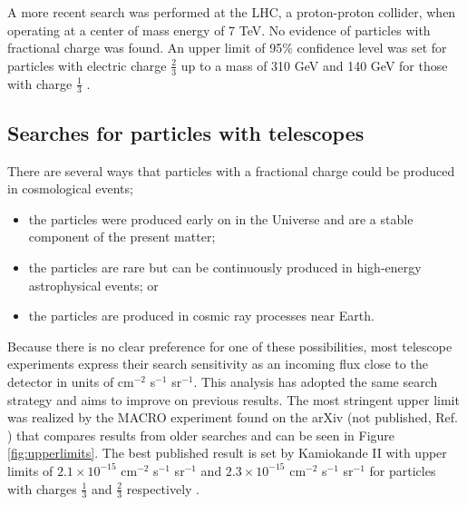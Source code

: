A more recent search was performed at the LHC, a proton-proton collider, when operating at a center of mass energy of 7 TeV. No evidence of particles with fractional charge was found. An upper limit of 95\% confidence level was set for particles with electric charge $\frac{2}{3}$ up to a mass of 310 GeV and 140 GeV for those with charge $\frac{1}{3}$ \cite{CMS:2012xi}.

\subsection{Searches for particles with telescopes}
There are several ways that particles with a fractional charge could be produced in cosmological events;

\vspace{2mm}
\begin{itemize}
\item the particles were produced early on in the Universe and are a stable component of the present matter;
\item the particles are rare but can be continuously produced in high-energy astrophysical events; or
\item the particles are produced in cosmic ray processes near Earth.
\end{itemize}
\vspace{2mm}

\noindent Because there is no clear preference for one of these possibilities, most telescope experiments express their search sensitivity as an incoming flux close to the detector in units of cm$^{-2}$ s$^{-1}$ sr$^{-1}$. This analysis has adopted the same search strategy and aims to improve on previous results. The most stringent upper limit was realized by the MACRO experiment found on the arXiv (not published, Ref. \cite{Ambrosio:2004ub}) that compares results from older searches and can be seen in Figure \ref{fig:upperlimits}. The best published result is set by Kamiokande II with upper limits of $2.1 \times 10^{-15}$ cm$^{-2}$ s$^{-1}$ sr$^{-1}$ and $2.3 \times 10^{-15}$ cm$^{-2}$ s$^{-1}$ sr$^{-1}$ for particles with charges $\frac{1}{3}$ and $\frac{2}{3}$ respectively \cite{Mori:1990kw}.

